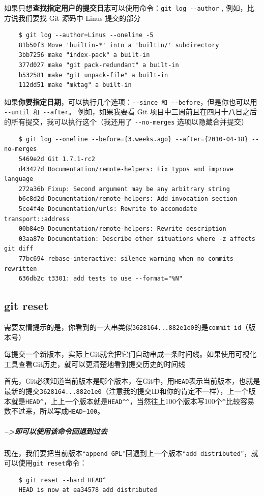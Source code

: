 \documentclass[UTF8,a4paper,12pt]{ctexbook}
\begin{document}
			如果只想\textbf{查找指定用户的提交日志}可以使用命令：\verb|git log --author| , 例如，比方说我们要找 Git 源码中 Linus 提交的部分
			\begin{lstlisting}
	$ git log --author=Linus --oneline -5
	81b50f3 Move 'builtin-*' into a 'builtin/' subdirectory
	3bb7256 make "index-pack" a built-in
	377d027 make "git pack-redundant" a built-in
	b532581 make "git unpack-file" a built-in
	112dd51 make "mktag" a built-in
			\end{lstlisting}
			
			如果\textbf{你要指定日期}，可以执行几个选项：\verb|--since 和 --before|，但是你也可以用 \verb|--until 和 --after|。 
			例如，如果我要看 Git 项目中三周前且在四月十八日之后的所有提交，我可以执行这个（我还用了 \verb|--no-merges| 选项以隐藏合并提交）
			\begin{lstlisting}
	$ git log --oneline --before={3.weeks.ago} --after={2010-04-18} --no-merges
	5469e2d Git 1.7.1-rc2
	d43427d Documentation/remote-helpers: Fix typos and improve language
	272a36b Fixup: Second argument may be any arbitrary string
	b6c8d2d Documentation/remote-helpers: Add invocation section
	5ce4f4e Documentation/urls: Rewrite to accomodate transport::address
	00b84e9 Documentation/remote-helpers: Rewrite description
	03aa87e Documentation: Describe other situations where -z affects git diff
	77bc694 rebase-interactive: silence warning when no commits rewritten
	636db2c t3301: add tests to use --format="%N"
			\end{lstlisting}
		\subsection{git reset}
			需要友情提示的是，你看到的一大串类似\verb|3628164...882e1e0|的是\verb|commit id|（版本号）
			
			每提交一个新版本，实际上Git就会把它们自动串成一条时间线。如果使用可视化工具查看Git历史，就可以更清楚地看到提交历史的时间线
			
			首先，Git必须知道当前版本是哪个版本，在Git中，用\verb|HEAD|表示当前版本，也就是最新的提交\verb|3628164...882e1e0|（注意我的提交ID和你的肯定不一样），上一个版本就是\verb|HEAD^|，上上一个版本就是\verb|HEAD^^|，当然往上100个版本写100个\verb|^|比较容易数不过来，所以写成\verb|HEAD~100|。
			
			\subparagraph{-->即可以使用该命令回退到过去}现在，我们要把当前版本“\verb|append GPL|”回退到上一个版本“\verb|add distributed|”，就可以使用\verb|git reset|命令：
			\begin{lstlisting}
	$ git reset --hard HEAD^
	HEAD is now at ea34578 add distributed
			\end{lstlisting}
			
\end{document}
